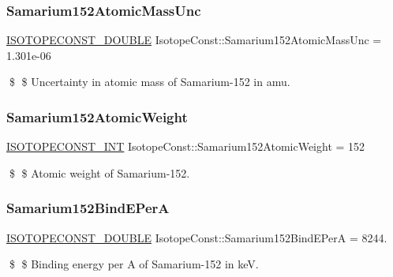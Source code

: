 \subsubsection{\texorpdfstring{Samarium152\+Atomic\+Mass\+Unc}{Samarium152AtomicMassUnc}}
{\footnotesize\ttfamily \mbox{\hyperlink{group___isotope_const-_macros_ga8f45a7272ce02c0b4c65c44636ed719a}{I\+S\+O\+T\+O\+P\+E\+C\+O\+N\+S\+T\+\_\+\+D\+O\+U\+B\+LE}} Isotope\+Const\+::\+Samarium152\+Atomic\+Mass\+Unc = 1.\+301e-\/06}

\$ \$ Uncertainty in atomic mass of Samarium-\/152 in amu. \mbox{\label{group___isotope_const-_samarium-_sm152_ga8fbbb75b19d3fe4c44250b2af6fd5e64}} 
\subsubsection{\texorpdfstring{Samarium152\+Atomic\+Weight}{Samarium152AtomicWeight}}
{\footnotesize\ttfamily \mbox{\hyperlink{group___isotope_const-_macros_ga5f18360b3e99483a35c32d789e62621c}{I\+S\+O\+T\+O\+P\+E\+C\+O\+N\+S\+T\+\_\+\+I\+NT}} Isotope\+Const\+::\+Samarium152\+Atomic\+Weight = 152}

\$ \$ Atomic weight of Samarium-\/152. \mbox{\label{group___isotope_const-_samarium-_sm152_gab146c85c94d10f52dacebfb4ea4b4089}} 
\subsubsection{\texorpdfstring{Samarium152\+Bind\+E\+PerA}{Samarium152BindEPerA}}
{\footnotesize\ttfamily \mbox{\hyperlink{group___isotope_const-_macros_ga8f45a7272ce02c0b4c65c44636ed719a}{I\+S\+O\+T\+O\+P\+E\+C\+O\+N\+S\+T\+\_\+\+D\+O\+U\+B\+LE}} Isotope\+Const\+::\+Samarium152\+Bind\+E\+PerA = 8244.}

\$ \$ Binding energy per A of Samarium-\/152 in keV. \mbox{\label{group___isotope_const-_samarium-_sm152_ga91d59cc739e06bdd2a8469ef216bcd71}} 
